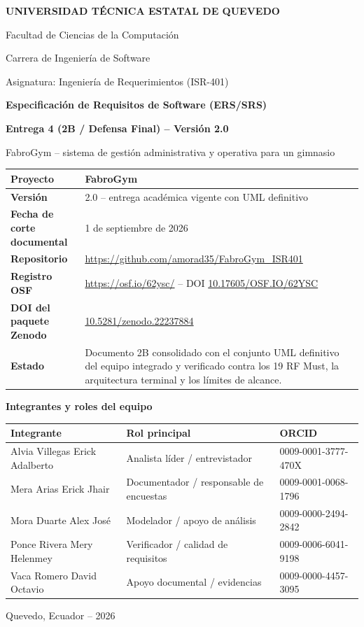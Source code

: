 \documentclass[11pt,a4paper,twoside]{article}
\newcommand{\zenododoi}{\href{https://doi.org/10.5281/zenodo.22237884}{10.5281/zenodo.22237884}}
\begin{document}
\begin{titlepage}
\centering
{\Large\bfseries UNIVERSIDAD TÉCNICA ESTATAL DE QUEVEDO\par}
\vspace{0.25cm}
{\large Facultad de Ciencias de la Computación\par}
{\large Carrera de Ingeniería de Software\par}
\vspace{0.45cm}
{\large Asignatura: Ingeniería de Requerimientos (ISR-401)\par}
\vspace{0.55cm}
{\LARGE\bfseries Especificación de Requisitos de Software (ERS/SRS)\par}
\vspace{0.25cm}
{\Large\bfseries Entrega 4 (2B / Defensa Final) -- Versión 2.0\par}
\vspace{0.18cm}
{\large FabroGym -- sistema de gestión administrativa y operativa para un gimnasio\par}
\vspace{0.5cm}
\begin{tabularx}{\textwidth}{|>{\bfseries}p{4.0cm}|X|}\hline
Proyecto & FabroGym \\\hline
Versión & 2.0 -- entrega académica vigente con UML definitivo \\\hline
Fecha de corte documental & 1 de septiembre de 2026 \\\hline
Repositorio & \url{https://github.com/amorad35/FabroGym_ISR401} \\\hline
Registro OSF & \url{https://osf.io/62ysc/} -- DOI \href{https://doi.org/10.17605/OSF.IO/62YSC}{10.17605/OSF.IO/62YSC} \\\hline
DOI del paquete Zenodo & \zenododoi \\\hline
Estado & Documento 2B consolidado con el conjunto UML definitivo del equipo integrado y verificado contra los 19 RF Must, la arquitectura terminal y los límites de alcance. \\\hline
\end{tabularx}
\vspace{0.35cm}
{\normalsize\bfseries Integrantes y roles del equipo\par}
\vspace{0.1cm}
\small
\begin{tabularx}{\textwidth}{|X|X|p{4.15cm}|}\hline
\textbf{Integrante} & \textbf{Rol principal} & \textbf{ORCID}\\\hline
Alvia Villegas Erick Adalberto & Analista líder / entrevistador & 0009-0001-3777-470X\\\hline
Mera Arias Erick Jhair & Documentador / responsable de encuestas & 0009-0001-0068-1796\\\hline
Mora Duarte Alex José & Modelador / apoyo de análisis & 0009-0000-2494-2842\\\hline
Ponce Rivera Mery Helenmey & Verificador / calidad de requisitos & 0009-0006-6041-9198\\\hline
Vaca Romero David Octavio & Apoyo documental / evidencias & 0009-0000-4457-3095\\\hline
\end{tabularx}
\vfill
\normalsize Quevedo, Ecuador -- 2026
\end{titlepage}
\end{document}
